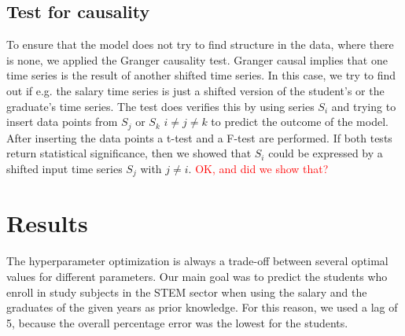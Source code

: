 \documentclass{article}
\theoremstyle{plain}
\theoremstyle{definition}
\theoremstyle{remark}
\begin{document}
\subsection{Test for causality}\label{sec:methods:causality}
To ensure that the model does not try to find structure in the data, where there is none, we applied the Granger causality test.
Granger causal implies that one time series is the result of another shifted time series.
In this case, we try to find out if e.g. the salary time series is just a shifted version of the student's or the graduate's time series.
The test does verifies this by using series $S_i$ and trying to insert data points from $S_j$ or $S_k$ $i \neq j\neq k$
to predict the outcome of the model. After inserting the data points a t-test and a F-test are performed. If both
tests return statistical significance, then we showed that $S_i$ could be expressed by a shifted input time series $S_j$ with $j\neq i$.
\textcolor{red}{OK, and did we show that?}




% 

\section{Results}\label{sec:results}
The hyperparameter optimization is always a trade-off between several optimal values for different parameters. 
Our main goal was to predict the students who enroll in study subjects in the STEM sector when using the salary and the
graduates of the given years as prior knowledge. For this reason, we used a lag of 5, because the overall percentage error
was the lowest for the students.
\end{document}
